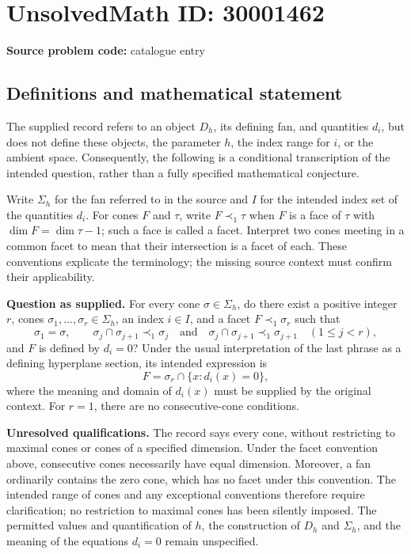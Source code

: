 \documentclass[11pt]{article}
\begin{document}
\section*{UnsolvedMath ID: 30001462}
\textbf{Source problem code:} catalogue entry
\subsection{Definitions and mathematical statement}
The supplied record refers to an object \(D_h\), its defining fan, and quantities \(d_i\), but does not define these objects, the parameter \(h\), the index range for \(i\), or the ambient space. Consequently, the following is a conditional transcription of the intended question, rather than a fully specified mathematical conjecture.

Write \(\Sigma_h\) for the fan referred to in the source and \(I\) for the intended index set of the quantities \(d_i\). For cones \(F\) and \(\tau\), write \(F\prec_1\tau\) when \(F\) is a face of \(\tau\) with \(\dim F=\dim\tau-1\); such a face is called a facet. Interpret two cones meeting in a common facet to mean that their intersection is a facet of each. These conventions explicate the terminology; the missing source context must confirm their applicability.

\textbf{Question as supplied.} For every cone \(\sigma\in\Sigma_h\), do there exist a positive integer \(r\), cones \(\sigma_1,\ldots,\sigma_r\in\Sigma_h\), an index \(i\in I\), and a facet \(F\prec_1\sigma_r\) such that
\[
\sigma_1=\sigma,
\qquad
\sigma_j\cap\sigma_{j+1}\prec_1\sigma_j
\quad\text{and}\quad
\sigma_j\cap\sigma_{j+1}\prec_1\sigma_{j+1}
\quad(1\leq j<r),
\]
and \(F\) is defined by \(d_i=0\)? Under the usual interpretation of the last phrase as a defining hyperplane section, its intended expression is
\[
F=\sigma_r\cap\{x:d_i(x)=0\},
\]
where the meaning and domain of \(d_i(x)\) must be supplied by the original context. For \(r=1\), there are no consecutive-cone conditions.

\textbf{Unresolved qualifications.} The record says every cone, without restricting to maximal cones or cones of a specified dimension. Under the facet convention above, consecutive cones necessarily have equal dimension. Moreover, a fan ordinarily contains the zero cone, which has no facet under this convention. The intended range of cones and any exceptional conventions therefore require clarification; no restriction to maximal cones has been silently imposed. The permitted values and quantification of \(h\), the construction of \(D_h\) and \(\Sigma_h\), and the meaning of the equations \(d_i=0\) remain unspecified.
\end{document}

